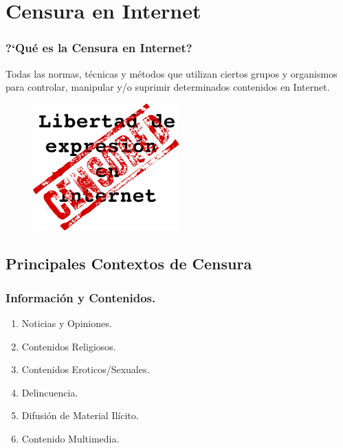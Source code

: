 \documentclass{beamer}
\begin{document}


\section{Censura en Internet}
\frame
{
\transdissolve[duration=0.2]
\frametitle{?`Qu\'e es la Censura en Internet?}
Todas las normas, t\'ecnicas y m\'etodos que utilizan ciertos grupos y organismos para controlar, manipular y/o suprimir determinados contenidos en Internet.
\begin{figure}
  \centering
    \includegraphics[width=0.5\textwidth]{lib_exp.png}
  \label{fig:ejemplo}
\end{figure}
}

\subsection{Principales Contextos de Censura}
\frame
{
\transdissolve[duration=0.2]
\frametitle{Informaci\'on y Contenidos.}
\begin{enumerate}
\item Noticias y Opiniones.
\item Contenidos Religiosos.
\item Contenidos Eroticos/Sexuales.
\item Delincuencia.
\item Difusi\'on de Material Il\'icito.
\item Contenido Multimedia.
\end{enumerate}
}
\end{document}
